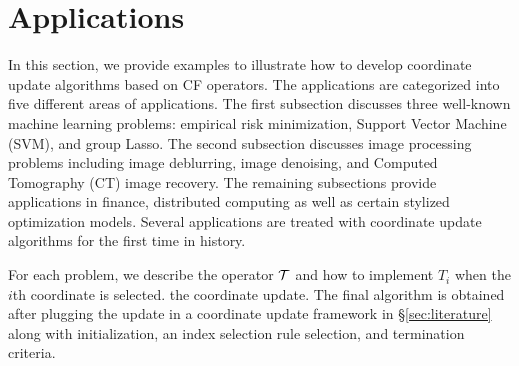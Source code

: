 \section{Applications}\label{sec:applications}
In this section, we provide examples to illustrate how to develop coordinate update algorithms based on CF operators. The applications are categorized into five different areas of applications. The first subsection discusses three well-known machine learning problems: empirical risk minimization, Support Vector Machine (SVM), and group Lasso. The second subsection  discusses image processing problems including image deblurring, image denoising, and  Computed Tomography (CT) image recovery. The remaining subsections provide applications in finance, distributed computing as well as certain stylized optimization models. Several applications are treated with coordinate update algorithms for the first time in history. 
\DIFaddbegin 

For each problem, we describe the operator ${\mathcal{T}}$ and how to implement $T_i$ when the $i$th coordinate is selected. the coordinate update. The final algorithm is obtained after plugging the update in a coordinate update framework in \S\ref{sec:literature} along with  initialization, an index selection rule selection, and termination criteria.
